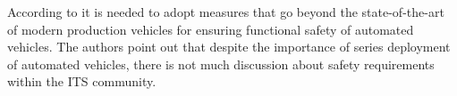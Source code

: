 According to \cite{stolte2016safety} it is needed to adopt measures that go beyond the state-of-the-art of modern production vehicles for ensuring functional safety of automated vehicles. The authors point out that despite the importance of series deployment of automated vehicles, there is not much discussion about safety requirements within the ITS community. 